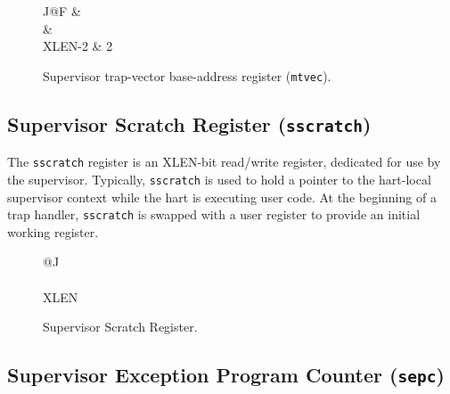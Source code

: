 \begin{figure*}[h!]
	{\footnotesize
		\begin{center}
			\begin{tabular}{J@{}F}
				 &
				 \\
				\hline
				 & 
				 \\
				\hline
				XLEN-2 & 2 \\
			\end{tabular}
		\end{center}
	}
	\vspace{-0.1in}
	\caption{Supervisor trap-vector base-address register ({\tt mtvec}).}
	\label{fig:stvecreg}
\end{figure*}

\subsection{Supervisor Scratch Register ({\tt sscratch})
}\label{supervisor-scratch-register-sscratch}

The {\tt sscratch} register is an XLEN-bit read/write register, dedicated for
use by the supervisor. Typically, {\tt sscratch} is used to hold a pointer to
the hart-local supervisor context while the hart is executing user code.
At the beginning of a trap handler, {\tt sscratch} is swapped with a user
register to provide an initial working register.

\begin{figure}[h!]
	{\footnotesize
		\begin{center}
			\begin{tabular}{@{}J}
				\instbitrange{XLEN-1}{0} \\
				\hline
				\multicolumn{1}{|c|}{\tt sscratch} \\
				\hline
				XLEN \\
			\end{tabular}
		\end{center}
	}
	\vspace{-0.1in}
	\caption{Supervisor Scratch Register.}
	\label{fig:sscratchreg}
\end{figure}

\subsection{Supervisor Exception Program Counter
({\tt sepc})}\label{supervisor-exception-program-counter-sepc}

